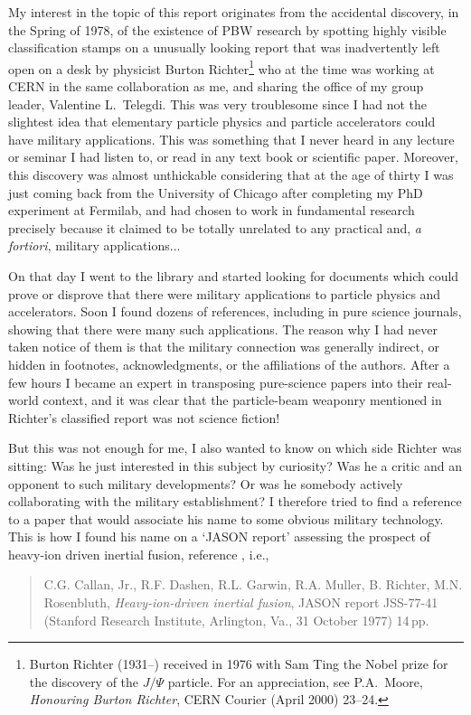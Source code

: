 \documentclass [12pt,a4paper,     ]{report} %
\begin{document}
 My interest in the topic of this report originates from the accidental discovery, in the Spring of 1978, of the existence of PBW research by spotting highly visible classification stamps on a unusually looking report that was inadvertently left open on a desk by physicist Burton Richter\footnote{Burton Richter (1931--) received in 1976 with Sam Ting the Nobel prize for the discovery of the $J/\Psi$ particle.  For an appreciation, see P.A.\ Moore, \emph{Honouring Burton Richter}, CERN Courier (April 2000) 23--24.} who at the time was working at CERN in the same collaboration as me, and sharing the office of my group leader, Valentine L.\ Telegdi.  This was very troublesome since I had not the slightest idea that elementary particle physics and particle accelerators could have military applications. This was something that I never heard in any lecture or seminar I had listen to, or read in any text book or scientific paper.  Moreover, this discovery was almost unthickable considering that at the age of thirty I was just coming back from the University of Chicago after completing my PhD experiment at Fermilab, and had chosen to work in fundamental research precisely because it claimed to be totally unrelated to any practical and, \emph{a fortiori}, military applications...  

On that day I went to the library and started looking for documents which could prove or disprove that there were military applications to particle physics and accelerators.  Soon I found dozens of references, including in pure science journals, showing that there were many such applications.  The reason why I had never taken notice of them is that the military connection was generally indirect, or hidden in footnotes, acknowledgments, or the affiliations of the authors.  After a few hours I became an expert in transposing pure-science papers into their real-world context, and it was clear that the particle-beam weaponry mentioned in Richter's classified report was not science fiction!

But this was not enough for me, I also wanted to know on which side Richter was sitting: Was he just interested in this subject by curiosity?  Was he a critic and an opponent to such military developments?  Or was he somebody actively collaborating with the military establishment?  I therefore tried to find a reference to a paper that would associate his name to some obvious military technology.  This is how I found his name on a `JASON report' assessing the prospect of heavy-ion driven inertial fusion, reference \cite{CALLA1977-}, i.e.,
%
\begin{quote}
C.G. Callan, Jr., R.F. Dashen, R.L. Garwin, R.A. Muller, B. Richter, M.N. Rosenbluth, \emph{Heavy-ion-driven inertial fusion}, JASON report JSS-77-41 (Stanford Research Institute, Arlington, Va., 31 October 1977) 14\,pp.
\end{quote}
\end{document}
